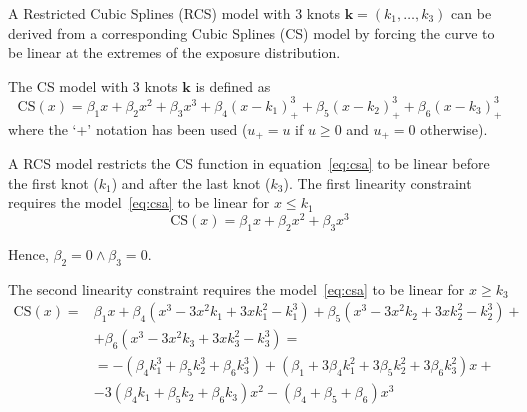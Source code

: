 \documentclass[11pt,a4paper,twoside,openany]{book}\usepackage{knitr}
\begin{document}
{{A Restricted Cubic Splines (RCS) model with 3 knots $\mathbf{k} = \left(k_1, \dots, k_3\right)$ can be derived from a corresponding Cubic Splines (CS) model by forcing the curve to be linear at the extremes of the exposure distribution.

\noindent The CS model with 3 knots $\mathbf{k}$ is defined as  
\begin{equation}
\mathrm{CS}(x) = \beta_1 x + \beta_2x^2 + \beta_3x^3 + \beta_4\left(x - k_1 \right)_{+}^3 + \beta_5\left( x - k_2\right)_{+}^3 + \beta_6\left( x - k_3\right)_{+}^3
\label{eq:csa}
\end{equation}
\noindent where the `+' notation has been used ($u_+ = u$ if $u \ge 0$ and $u_+ = 0$ otherwise).

\noindent A RCS model restricts the CS function in equation~\ref{eq:csa} to be linear before the first knot ($k_1$) and after the last knot ($k_3$). 
The first linearity constraint requires the model~\ref{eq:csa} to be linear for $x \le k_1$ 
\begin{equation*}
\mathrm{CS}(x) = \beta_1 x + \beta_2x^2 + \beta_3x^3
\label{eq:cs_k1a}
\end{equation*}

\noindent Hence, $\beta_2 = 0 \land \beta_3 = 0$.

\noindent The second linearity constraint requires the model~\ref{eq:csa} to be linear for $x \ge k_3$ 
\begin{align*}
\mathrm{CS}(x) =  & \beta_1 x + \beta_4\left( x^3 - 3x^2k_1 + 3xk_1^2- k_1^3 \right) + \beta_5\left( x^3 - 3x^2k_2 + 3xk_2^2- k_2^3 \right) + \nonumber \\
	&+ \beta_6\left( x^3 - 3x^2k_3 + 3xk_3^2- k_3^3 \right) =  \nonumber \\
	&= - \left(\beta_4k_1^3 + \beta_5k_2^3 + \beta_6k_3^3 \right) + \left( \beta_1 + 3\beta_4k_1^2 + 3\beta_5k_2^2 + 3\beta_6k_3^2\right)x +  \nonumber \\
	&- 3\left( \beta_4k_1 + \beta_5k_2 + \beta_6k_3\right)x^2 - \left( \beta_4 + \beta_5 + \beta_6\right)x^3
\label{eq:cs_k3a}
\end{align*}
 
}}
\end{document}

